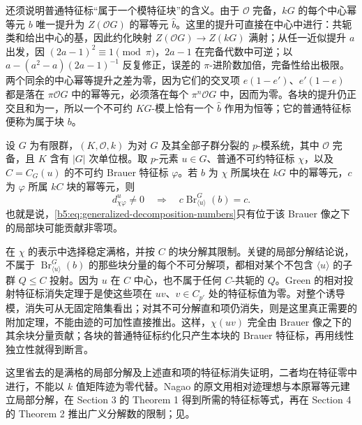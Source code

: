 还须说明普通特征标“属于一个模特征块”的含义。由于 \(\mathcal O\) 完备，\(kG\) 的每个中心幂等元 \(b\) 唯一提升为 \(Z(\mathcal OG)\) 的幂等元 \(\widehat b\)。这里的提升可直接在中心中进行：共轭类和给出中心的基，因此约化映射 \(Z(\mathcal OG)\to Z(kG)\) 满射；从任一近似提升 \(a\) 出发，因 \((2a-1)^2\equiv1\pmod\pi\)，\(2a-1\) 在完备代数中可逆；以 \(a-(a^2-a)(2a-1)^{-1}\) 反复修正，误差的 \(\pi\)-进阶数加倍，完备性给出极限。两个同余的中心幂等提升之差为零，因为它们的交叉项 \(e(1-e')\)、\(e'(1-e)\) 都是落在 \(\pi\mathcal OG\) 中的幂等元，必须落在每个 \(\pi^n\mathcal OG\) 中，因而为零。各块的提升仍正交且和为一，所以一个不可约 \(KG\)-模上恰有一个 \(\widehat b\) 作用为恒等；它的普通特征标便称为属于块 \(b\)。

\begin{theorem}\label{b5:thm:brauer-second-main}
	设 \(G\) 为有限群，\((K,\mathcal O,k)\) 为对 \(G\) 及其全部子群分裂的 \(p\)-模系统，其中 \(\mathcal O\) 完备，且 \(K\) 含有 \(|G|\) 次单位根。取 \(p\)-元素 \(u\in G\)、普通不可约特征标 \(\chi\)，以及 \(C=C_G(u)\) 的不可约 Brauer 特征标 \(\varphi\)。若 \(b\) 为 \(\chi\) 所属块在 \(kG\) 中的幂等元，\(c\) 为 \(\varphi\) 所属 \(kC\) 块的幂等元，则
	\[
		d^u_{\chi\varphi}\ne0
		\quad\Longrightarrow\quad
		c\operatorname{Br}_{\langle u\rangle}^G(b)=c.
	\]
	也就是说，\eqref{b5:eq:generalized-decomposition-numbers}只有位于该 Brauer 像之下的局部块可能贡献非零项。
\end{theorem}
\begin{proofsketch}
	在 \(\chi\) 的表示中选择稳定满格，并按 \(C\) 的块分解其限制。关键的局部分解结论说，不属于 \(\operatorname{Br}_{\langle u\rangle}^G(b)\) 的那些块分量的每个不可分解项，都相对某个不包含 \(\langle u\rangle\) 的子群 \(Q\le C\) 投射。因为 \(u\) 在 \(C\) 中心，也不属于任何 \(C\)-共轭的 \(Q\)。Green 的相对投射特征标消失定理于是使这些项在 \(uv\)、\(v\in C_{p'}\) 处的特征标值为零。对整个诱导模，消失可从无固定陪集看出；对其不可分解直和项仍消失，则是这里真正需要的附加定理，不能由迹的可加性直接推出。这样，\(\chi(uv)\) 完全由 Brauer 像之下的其余块分量贡献；各块的普通特征标约化只产生本块的 Brauer 特征标，再用线性独立性就得到断言。

	这里省去的是满格的局部分解及上述直和项的特征标消失证明，二者均在特征零中进行，不能以 \(k\) 值矩阵迹为零代替。Nagao 的原文用相对迹理想与本原幂等元建立局部分解，在 Section 3 的 Theorem 1 得到所需的特征标等式，再在 Section 4 的 Theorem 2 推出广义分解数的限制；见\cite[Sections 3--4, Theorems 1--2]{Nagao1963GeneralizedDecompositionNumbers}。
\end{proofsketch}

